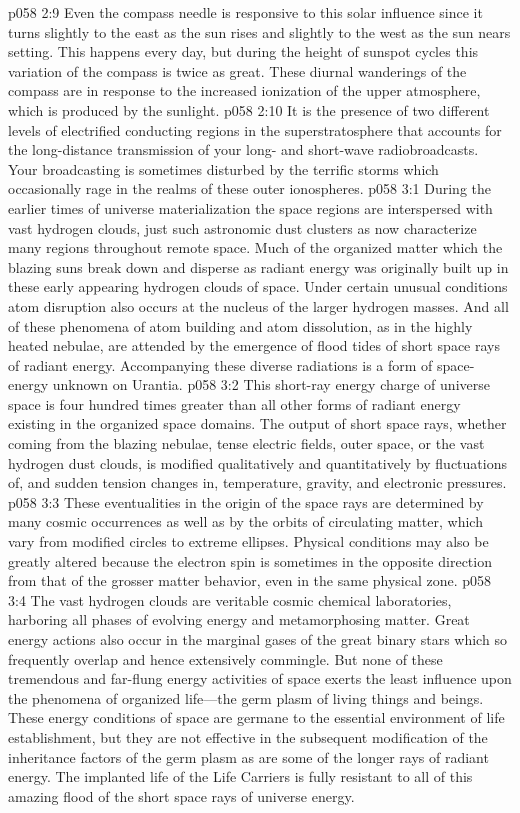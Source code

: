 \vs p058 2:9 Even the compass needle is responsive to this solar influence since it turns slightly to the east as the sun rises and slightly to the west as the sun nears setting. This happens every day, but during the height of sunspot cycles this variation of the compass is twice as great. These diurnal wanderings of the compass are in response to the increased ionization of the upper atmosphere, which is produced by the sunlight.
\vs p058 2:10 It is the presence of two different levels of electrified conducting regions in the superstratosphere that accounts for the long\hyp{}distance transmission of your long\hyp{} and short\hyp{}wave radiobroadcasts. Your broadcasting is sometimes disturbed by the terrific storms which occasionally rage in the realms of these outer ionospheres.
\vs p058 3:1 During the earlier times of universe materialization the space regions are interspersed with vast hydrogen clouds, just such astronomic dust clusters as now characterize many regions throughout remote space. Much of the organized matter which the blazing suns break down and disperse as radiant energy was originally built up in these early appearing hydrogen clouds of space. Under certain unusual conditions atom disruption also occurs at the nucleus of the larger hydrogen masses. And all of these phenomena of atom building and atom dissolution, as in the highly heated nebulae, are attended by the emergence of flood tides of short space rays of radiant energy. Accompanying these diverse radiations is a form of space\hyp{}energy unknown on Urantia.
\vs p058 3:2 This short\hyp{}ray energy charge of universe space is four hundred times greater than all other forms of radiant energy existing in the organized space domains. The output of short space rays, whether coming from the blazing nebulae, tense electric fields, outer space, or the vast hydrogen dust clouds, is modified qualitatively and quantitatively by fluctuations of, and sudden tension changes in, temperature, gravity, and electronic pressures.
\vs p058 3:3 These eventualities in the origin of the space rays are determined by many cosmic occurrences as well as by the orbits of circulating matter, which vary from modified circles to extreme ellipses. Physical conditions may also be greatly altered because the electron spin is sometimes in the opposite direction from that of the grosser matter behavior, even in the same physical zone.
\vs p058 3:4 The vast hydrogen clouds are veritable cosmic chemical laboratories, harboring all phases of evolving energy and metamorphosing matter. Great energy actions also occur in the marginal gases of the great binary stars which so frequently overlap and hence extensively commingle. But none of these tremendous and far\hyp{}flung energy activities of space exerts the least influence upon the phenomena of organized life---the germ plasm of living things and beings. These energy conditions of space are germane to the essential environment of life establishment, but they are not effective in the subsequent modification of the inheritance factors of the germ plasm as are some of the longer rays of radiant energy. The implanted life of the Life Carriers is fully resistant to all of this amazing flood of the short space rays of universe energy.
